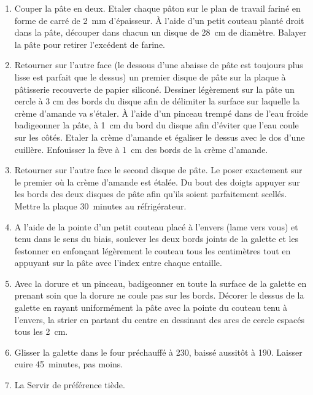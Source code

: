 \begin{recipe}
  \begin{enumerate}

  \item Couper la pâte en deux. Etaler chaque pâton sur le plan de
    travail fariné en forme de carré de 2~mm d’épaisseur.  À l’aide
    d’un petit couteau planté droit dans la pâte, découper dans chacun
    un disque de 28~cm de diamètre.  Balayer la pâte pour retirer
    l’excédent de farine.

  \item Retourner sur l’autre face (le dessous d’une abaisse de pâte
    est toujours plus lisse est parfait que le dessus) un premier
    disque de pâte sur la plaque à pâtisserie recouverte de papier
    siliconé.  Dessiner légèrement sur la pâte un cercle à 3 cm des
    bords du disque afin de délimiter la surface sur laquelle la crème
    d’amande va s'étaler.  À l’aide d’un pinceau trempé dans de l’eau
    froide badigeonner la pâte, à 1~cm du bord du disque afin d’éviter
    que l’eau coule sur les côtés.  Etaler la crème d’amande et
    égaliser le dessus avec le dos d’une cuillère.  Enfouisser la fève
    à 1~cm des bords de la crème d’amande.

  \item Retourner sur l’autre face le second disque de pâte.  Le poser
    exactement sur le premier où la crème d’amande est étalée.  Du
    bout des doigts appuyer sur les bords des deux disques de pâte
    afin qu’ils soient parfaitement scellés. Mettre la plaque
    30~minutes au réfrigérateur.

  \item A l’aide de la pointe d’un petit couteau placé à l’envers
    (lame vers vous) et tenu dans le sens du biais, soulever les deux
    bords joints de la galette et les festonner en enfonçant
    légèrement le couteau tous les centimètres tout en appuyant sur la
    pâte avec l’index entre chaque entaille.

  \item Avec la dorure et un pinceau, badigeonner en toute la surface
    de la galette en prenant soin que la dorure ne coule pas sur les
    bords.  Décorer le dessus de la galette en rayant uniformément la
    pâte avec la pointe du couteau tenu à l’envers, la strier en
    partant du centre en dessinant des arcs de cercle espacés tous les
    2~cm.

  \item Glisser la galette dans le four préchauffé à 230\degreeC, baissé
    aussitôt à 190\degreeC. Laisser cuire 45~minutes, pas moins.

  \item La Servir de préférence tiède.

  \end{enumerate}
\end{recipe}

